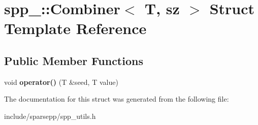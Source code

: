 \hypertarget{structspp___1_1_combiner}{}\section{spp\+\_\+\+:\+:Combiner$<$ T, sz $>$ Struct Template Reference}
\label{structspp___1_1_combiner}
\subsection*{Public Member Functions}
\begin{DoxyCompactItemize}
\item 
void {\bfseries operator()} (T \&seed, T value)\hypertarget{structspp___1_1_combiner_ac1b48a245f1e5a2ceea3dee737062f5d}{}\label{structspp___1_1_combiner_ac1b48a245f1e5a2ceea3dee737062f5d}

\end{DoxyCompactItemize}


The documentation for this struct was generated from the following file\+:\begin{DoxyCompactItemize}
\item 
include/sparsepp/spp\+\_\+utils.\+h\end{DoxyCompactItemize}
